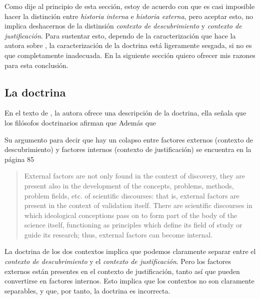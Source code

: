 Como dije al principio de esta sección, estoy de acuerdo con que es casi imposible hacer la distinción entre \emph{historia interna} e \emph{historia externa}, pero aceptar esto, no implica deshacernos de la distinsión \emph{contexto de descubrimiento} y \emph{contexto de justificación}.
Para sustentar esto, dependo de la caracterización que hace la autora sobre , la caracterización de la doctrina está ligeramente sesgada, si no es que completamente inadecuada.
En la siguiente sección quiero ofrecer mis razones para esta conclusión.

\subsection{La doctrina}

\noindent En el texto de \textcite[][p.75]{Yturbe1995}, la autora ofrece una descripción de la doctrina, ella señala que los filósofos doctrinarios afirman que 
Además que 


Su argumento para decir que hay un colapso entre factores externos (contexto de descubrimiento) y factores internos (contexto de justificación) se encuentra en la página 85

\begin{quote}

	External factors are not only found in the context of discovery, they are present also in the development of the concepts, problems, methods, problem fields, etc. of scientific discourses: that is, external factors are present in the context of validation itself.
	There are scientific discourses in which ideological conceptions pass on to form part of the body of the science itself, functioning as principles which define its field of study or guide its research; thus, external factors can become internal.

\end{quote}

La doctrina de los dos contextos implica que podemos claramente separar entre el \emph{contexto de descubrimiento} y el \emph{contexto de justificación}.
Pero los factores externos están presentes en el contexto de justificación, tanto así que pueden convertirse en factores internos.
Esto implica que los contextos no son claramente separables, y que, por tanto, la doctrina es incorrecta.

